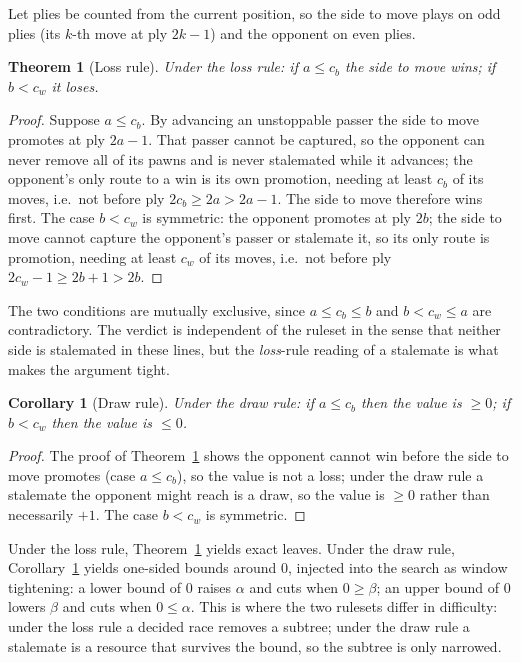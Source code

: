 \documentclass[Afour,sageapa,times]{sagej}
\theoremstyle{plain}
\newtheorem{theorem}{Theorem}
\newtheorem{corollary}{Corollary}
\theoremstyle{definition}
\begin{document}
Let plies be counted from the current position, so the side to move plays on odd
plies (its $k$-th move at ply $2k-1$) and the opponent on even plies.

\begin{theorem}[Loss rule]\label{thm:race}
Under the loss rule: if $a\le c_b$ the side to move wins; if $b<c_w$ it loses.
\end{theorem}

\begin{proof}
Suppose $a\le c_b$. By advancing an unstoppable passer the side to move promotes
at ply $2a-1$. That passer cannot be captured, so the opponent can never remove
all of its pawns and is never stalemated while it advances; the opponent's only
route to a win is its own promotion, needing at least $c_b$ of its moves, i.e.\
not before ply $2c_b\ge 2a>2a-1$. The side to move therefore wins first. The case
$b<c_w$ is symmetric: the opponent promotes at ply $2b$; the side to move cannot
capture the opponent's passer or stalemate it, so its only route is promotion,
needing at least $c_w$ of its moves, i.e.\ not before ply $2c_w-1\ge 2b+1>2b$.
\end{proof}

The two conditions are mutually exclusive, since $a\le c_b\le b$ and $b<c_w\le a$
are contradictory. The verdict is independent of the ruleset in the sense that
neither side is stalemated in these lines, but the \emph{loss}-rule reading of a
stalemate is what makes the argument tight.

\begin{corollary}[Draw rule]\label{cor:racebounds}
Under the draw rule: if $a\le c_b$ then the value is $\ge 0$; if $b<c_w$ then the
value is $\le 0$.
\end{corollary}

\begin{proof}
The proof of Theorem~\ref{thm:race} shows the opponent cannot win before the
side to move promotes (case $a\le c_b$), so the value is not a loss; under the
draw rule a stalemate the opponent might reach is a draw, so the value is $\ge 0$
rather than necessarily $+1$. The case $b<c_w$ is symmetric.
\end{proof}

Under the loss rule, Theorem~\ref{thm:race} yields exact leaves. Under the draw
rule, Corollary~\ref{cor:racebounds} yields one-sided bounds around $0$, injected
into the search as window tightening: a lower bound of $0$ raises $\alpha$ and
cuts when $0\ge\beta$; an upper bound of $0$ lowers $\beta$ and cuts when
$0\le\alpha$. This is where the two rulesets differ in difficulty: under the loss
rule a decided race removes a subtree; under the draw rule a stalemate is a
resource that survives the bound, so the subtree is only narrowed.
\end{document}
